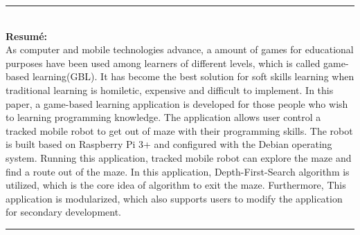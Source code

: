 \cleardoublepage
{} %
\begin{vcentrepage}
\noindent\rule[2pt]{\textwidth}{0.2pt}\\

{\large\textbf{Resumé:}\\}
As computer and mobile technologies advance, a amount of games for educational purposes have been used among learners of different levels, which is called game-based learning(GBL).
It has become the best solution for soft skills learning when traditional learning is homiletic, expensive and difficult to implement.
In this paper, a game-based learning application is developed for those people who wish to learning programming knowledge. 
The application allows user control a tracked mobile robot to get out of maze with their programming skills. 
The robot is built based on Raspberry Pi 3+ and configured with the Debian operating system.
Running this application, tracked mobile robot can explore the maze and find a route out of the maze. In this application, Depth-First-Search algorithm is utilized, which is the core idea of algorithm to exit the maze.
Furthermore, This application is modularized, which also supports users to modify the application for secondary development.

\noindent\rule[2pt]{\textwidth}{0.8pt}
\end{vcentrepage}



\restoregeometry
